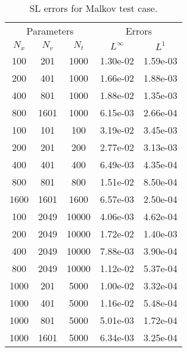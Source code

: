 \begin{table}[H]
	\centering
	\begin{tabular}{|ccc|cc|} \hline
	\multicolumn{3}{|c|}{Parameters} & \multicolumn{2}{c|}{Errors} \\ 
	\cline{1-5} $N_x$ & $N_v$ & $N_t$ & $L^{\infty}$ & $L^1$ \\ 
	\hline \hline 
	100 & 201 & 1000 & 1.30e-02 & 1.59e-03 \\ \hline 
	200 & 401 & 1000 & 1.66e-02 & 1.88e-03 \\ \hline 
	400 & 801 & 1000 & 1.88e-02 & 1.35e-03 \\ \hline 
	800 & 1601 & 1000 & 6.15e-03 & 2.66e-04 \\ \hline \hline
	100 & 101 & 100 & 3.19e-02 & 3.45e-03 \\ \hline 
	200 & 201 & 200 & 2.77e-02 & 3.13e-03 \\ \hline 
	400 & 401 & 400 & 6.49e-03 & 4.35e-04 \\ \hline 
	800 & 801 & 800 & 1.51e-02 & 8.50e-04 \\ \hline 
	1600 & 1601 & 1600 & 6.57e-03 & 2.50e-04 \\ \hline \hline
	100 & 2049 & 10000 & 4.06e-03 & 4.62e-04 \\ \hline 
	200 & 2049 & 10000 & 1.72e-02 & 1.40e-03 \\ \hline 
	400 & 2049 & 10000 & 7.88e-03 & 3.90e-04 \\ \hline 
	800 & 2049 & 10000 & 1.12e-02 & 5.37e-04 \\ \hline \hline
	1000 & 201 & 5000 & 1.00e-02 & 3.32e-04 \\ \hline 
	1000 & 401 & 5000 & 1.16e-02 & 5.48e-04 \\ \hline 
	1000 & 801 & 5000 & 5.01e-03 & 1.72e-04 \\ \hline 
	1000 & 1601 & 5000 & 6.34e-03 & 3.25e-04 \\ \hline 
	\end{tabular}
	\caption{SL errors for Malkov test case.}
	\label{tab:Malkov_SL}
\end{table}
